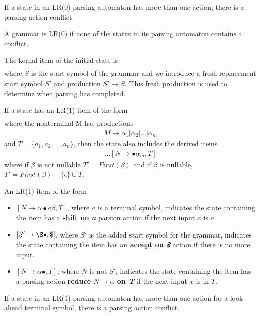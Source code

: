 If a state in an LR(0) parsing automaton has more than one action, 
there is a parsing action conflict.

A grammar is LR(0) if none of the states in its parsing 
automaton contains a conflict.


The kernal item of the initial state is
\begin{align*}
    [S' \rightarrow \bullet S, \$]
\end{align*}
where $S$ is the start symbol of the grammar and we introduce a fresh replacement start 
symbol $S'$ and production $S' \rightarrow S$. This fresh production is used to determine 
when parsing has completed.

If a state has an LR(1) item of the form
\begin{align*}
    [N \rightarrow \alpha \bullet M \beta, T]
\end{align*}
where the nonterminal M has productions
\begin{align*}
    M \rightarrow \alpha_1 | \alpha_2 | \dots | \alpha_m
\end{align*}
and $T = \{a_1, a_2, \dots, a_n\}$, then the state also includes the derived items
\begin{align*}
    [N \rightarrow \bullet \alpha_1, T]
    \dots
    [N \rightarrow \bullet \alpha_m, T]
\end{align*}
where if $\beta$ is not nullable $T' = First(\beta)$ and if $\beta$ is nullable, 
$T' = First(\beta) - \{\epsilon\} \cup T$.

An LR(1) item of the form
\begin{itemize}
    \item $[N \rightarrow \alpha \bullet a \beta, T]$, where $a$ is a terminal symbol, 
    indicates the state containing the item has a \textbf{shift on \textit{a}} parsion action if the
    next input $x$ is $a$
    \item $[S' \rightarrow \S \bullet, \$]$, where $S'$ is the added start symbol for 
    the grammar, indicates the state containing the item has an \textbf{accept on \textit{\$}} action 
    if there is no more input.
    \item $[N \rightarrow \alpha \bullet, T]$, where $N$ is not $S'$, indicates the state 
    containing the item has a parsing action \textbf{reduce $N \rightarrow \alpha$ on \textit{T}} if 
    the next input $x$ is in $T$.
\end{itemize}
If a state in an LR(1) parsing automaton has more than one action for a look-ahead 
terminal symbol, there is a parsing action conflict.

